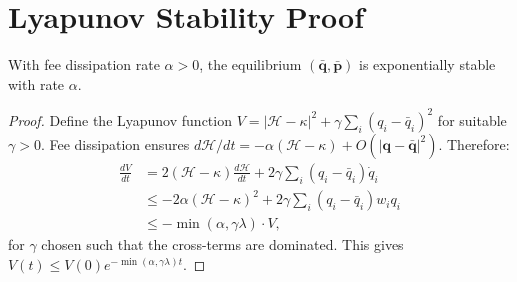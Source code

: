 \section{Lyapunov Stability Proof}

\label{app:lyapunov}

\begin{theorem}
With fee dissipation rate $\alpha > 0$, the equilibrium $(\bar{\bm{q}}, \bar{\bm{p}})$ is exponentially stable with rate $\alpha$.
\end{theorem}

\begin{proof}
Define the Lyapunov function $V = |\mathcal{H} - \kappa|^2 + \gamma\sum_i(q_i - \bar{q}_i)^2$ for suitable $\gamma > 0$. Fee dissipation ensures $d\mathcal{H}/dt = -\alpha(\mathcal{H} - \kappa) + O(|\bm{q} - \bar{\bm{q}}|^2)$. Therefore:
\begin{align}
\frac{dV}{dt} &= 2(\mathcal{H} - \kappa)\frac{d\mathcal{H}}{dt} + 2\gamma\sum_i(q_i - \bar{q}_i)\dot{q}_i \\
&\le -2\alpha(\mathcal{H} - \kappa)^2 + 2\gamma\sum_i(q_i - \bar{q}_i)w_iq_i \\
&\le -\min(\alpha, \gamma\lambda) \cdot V,
\end{align}
for $\gamma$ chosen such that the cross-terms are dominated. This gives $V(t) \le V(0)e^{-\min(\alpha,\gamma\lambda)t}$.
\end{proof}

